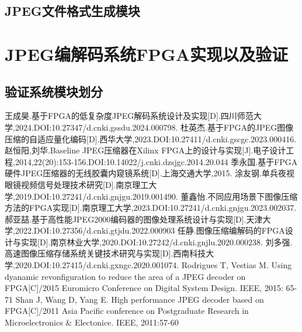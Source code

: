 \documentclass{article}
\numberwithin {equation}{section}
\begin{document}
\begin{spacing}{1.25}
  \subsection{JPEG文件格式生成模块}
    \vspace{1em}

\newpage
\section{JPEG编解码系统FPGA实现以及验证}
  \subsection{验证系统模块划分}
\newpage
\begin{thebibliography}{20}
  王成昊.基于FPGA的低复杂度JPEG解码系统设计及实现[D].四川师范大学,2024.DOI:10.27347/d.cnki.gssdu.2024.000798.
  杜英杰.基于FPGA的JPEG图像压缩的自适应量化编码[D].西华大学,2023.DOI:10.27411/d.cnki.gscgc.2023.000416. 
  赵恒阳,刘华.Baseline JPEG压缩器在Xilinx FPGA上的设计与实现[J].电子设计工程,2014,22(20):153-156.DOI:10.14022/j.cnki.dzsjgc.2014.20.044
  季永国.基于FPGA硬件JPEG压缩器的无线胶囊内窥镜系统[D].上海交通大学,2015.
  涂友钢.单兵夜视眼镜视频信号处理技术研究[D].南京理工大学,2019.DOI:10.27241/d.cnki.gnjgu.2019.001490.
  董鑫怡.不同应用场景下图像压缩方法的FPGA实现[D].南京理工大学,2023.DOI:10.27241/d.cnki.gnjgu.2023.002037. 
  郝亚喆.基于高性能JPEG2000编码器的图像处理系统设计与实现[D].天津大学,2022.DOI:10.27356/d.cnki.gtjdu.2022.000903
  任静.图像压缩编解码的FPGA设计与实现[D].南京林业大学,2020.DOI:10.27242/d.cnki.gnjlu.2020.000238.
  刘多强.高速图像压缩存储系统关键技术研究与实现[D].西南科技大学,2020.DOI:10.27415/d.cnki.gxngc.2020.001074.
  Rodrigues T, Vestias M. Using dyanamic revonfiguration to reduce the area of a JPEG decoder on FPGA[C]/2015 Euromicro Conference on Digital System Design. IEEE, 2015: 65-71
  Shan J, Wang D, Yang E. High performance JPEG decoder based on FPGA[C]/2011 Asia Pacific conference on Postgraduate Research in Microelectronics \& Electonice. IEEE, 2011:57-60
\end{thebibliography}

\end{spacing}
\end{document}
